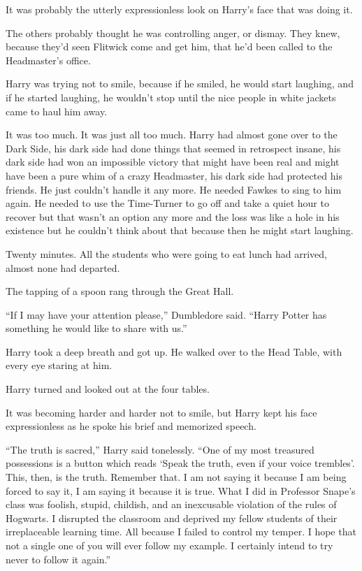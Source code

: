 It was probably the utterly expressionless look on Harry’s face that was doing it.

The others probably thought he was controlling anger, or dismay. They knew, because they’d seen Flitwick come and get him, that he’d been called to the Headmaster’s office.

Harry was trying not to smile, because if he smiled, he would start laughing, and if he started laughing, he wouldn’t stop until the nice people in white jackets came to haul him away.

It was too much. It was just all too much. Harry had almost gone over to the Dark Side, his dark side had done things that seemed in retrospect insane, his dark side had won an impossible victory that might have been real and might have been a pure whim of a crazy Headmaster, his dark side had protected his friends. He just couldn’t handle it any more. He needed Fawkes to sing to him again. He needed to use the Time-Turner to go off and take a quiet hour to recover but that wasn’t an option any more and the loss was like a hole in his existence but he couldn’t think about that because then he might start laughing.

Twenty minutes. All the students who were going to eat lunch had arrived, almost none had departed.

The tapping of a spoon rang through the Great Hall.

“If I may have your attention please,” Dumbledore said. “Harry Potter has something he would like to share with us.”

Harry took a deep breath and got up. He walked over to the Head Table, with every eye staring at him.

Harry turned and looked out at the four tables.

It was becoming harder and harder not to smile, but Harry kept his face expressionless as he spoke his brief and memorized speech.

“The truth is sacred,” Harry said tonelessly. “One of my most treasured possessions is a button which reads ‘Speak the truth, even if your voice trembles’. This, then, is the truth. Remember that. I am not saying it because I am being forced to say it, I am saying it because it is true. What I did in Professor Snape’s class was foolish, stupid, childish, and an inexcusable violation of the rules of Hogwarts. I disrupted the classroom and deprived my fellow students of their irreplaceable learning time. All because I failed to control my temper. I hope that not a single one of you will ever follow my example. I certainly intend to try never to follow it again.”

